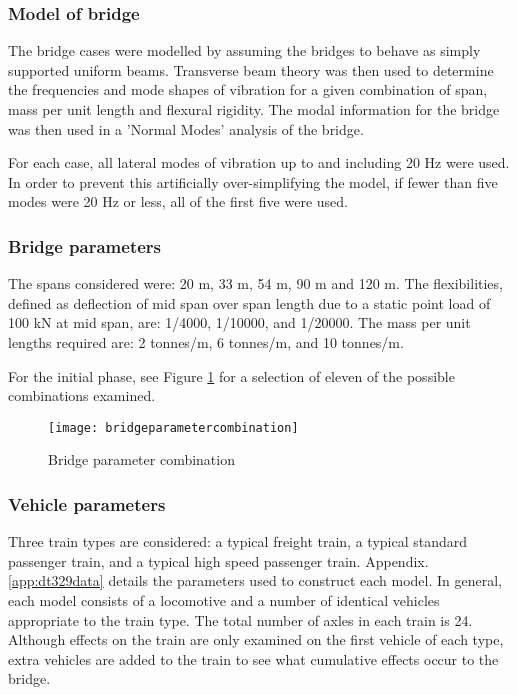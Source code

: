 \subsubsection{Model of bridge}
The bridge cases were modelled by assuming the bridges to behave as simply supported uniform beams. Transverse beam theory was then used to determine the frequencies and mode shapes of vibration for a given combination of span, mass per unit length and flexural rigidity. The modal information for the bridge was then used in a 'Normal Modes' analysis of the bridge.

For each case, all lateral modes of vibration up to and including 20 Hz were used. In order to prevent this artificially over-simplifying the model, if fewer than five modes were 20 Hz or less, all of the first five were used.

\subsubsection{Bridge parameters}

The spans considered were: 20 m, 33 m, 54 m, 90 m and 120 m. The flexibilities, defined as deflection of mid span over span length due to a static point load of 100 kN at mid span, are: 1/4000, 1/10000, and 1/20000. The mass per unit lengths required are: 2 tonnes/m, 6 tonnes/m, and 10 tonnes/m.

For the initial phase, see Figure \ref{fig:bridgeparametercombination} for a selection of eleven of the possible combinations examined.

\begin{figure}[h]
    \centering
    \texttt{[image: bridgeparametercombination]}
    \caption{Bridge parameter combination}
    \label{fig:bridgeparametercombination}
\end{figure}

\subsubsection{Vehicle parameters}
Three train types are considered: a typical freight train, a typical standard passenger train, and a typical high speed passenger train. Appendix.\ref{app:dt329data} details the parameters used to construct each model. In general, each model consists of a locomotive and a number of identical vehicles appropriate to the train type. The total number of axles in each train is 24. Although effects on the train are only examined on the first vehicle of each type, extra vehicles are added to the train to see what cumulative effects occur to the bridge.

